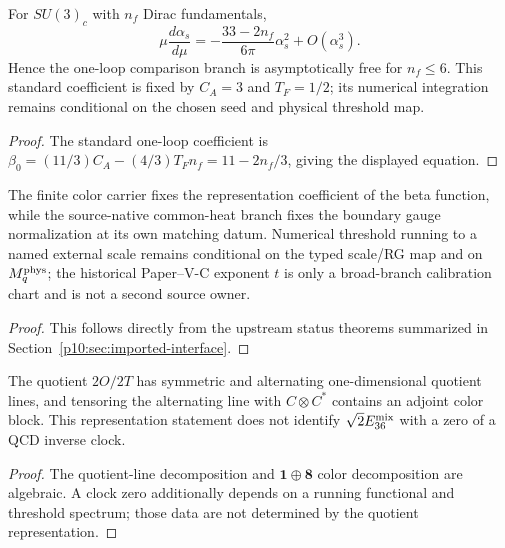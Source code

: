 \documentclass[12pt,a4paper]{article}
\begin{document}
\begin{theorem}
\label{p10:thm:born-hopf-asymptotic-freedom}
For \(SU(3)_c\) with \(n_f\) Dirac fundamentals,
\begin{equation}
\label{p10:eq:one-loop-alpha-beta-derived}
\mu\frac{d\alpha_s}{d\mu}=-\frac{33-2n_f}{6\pi}\alpha_s^2+O(\alpha_s^3).
\end{equation}
Hence the one-loop comparison branch is asymptotically free for \(n_f\le6\).  This standard coefficient is fixed by \(C_A=3\) and \(T_F=1/2\); its numerical integration remains conditional on the chosen seed and physical threshold map.
\end{theorem}
\begin{proof}
The standard one-loop coefficient is \(\beta_0=(11/3)C_A-(4/3)T_F n_f=11-2n_f/3\), giving the displayed equation.
\end{proof}

\begin{lemma}
\label{p10:lem:strong-running-import-chain}
The finite color carrier fixes the representation coefficient of the beta function, while the source-native common-heat branch fixes the boundary gauge normalization at its own matching datum.  Numerical threshold running to a named external scale remains conditional on the typed scale/RG map and on \(M_q^{\rm phys}\); the historical Paper--V-C exponent \(t\) is only a broad-branch calibration chart and is not a second source owner.
\end{lemma}
\begin{proof}
This follows directly from the upstream status theorems summarized in Section~\ref{p10:sec:imported-interface}.
\end{proof}

\begin{lemma}
\label{p10:lem:e36-alternating-adjoint-block}
The quotient \(2O/2T\) has symmetric and alternating one-dimensional quotient lines, and tensoring the alternating line with \(C\otimes C^*\) contains an adjoint color block.  This representation statement does not identify \(\sqrt2E_{36}^{\rm mix}\) with a zero of a QCD inverse clock.
\end{lemma}
\begin{proof}
The quotient-line decomposition and \(\mathbf1\oplus\mathbf8\) color decomposition are algebraic.  A clock zero additionally depends on a running functional and threshold spectrum; those data are not determined by the quotient representation.
\end{proof}
\end{document}
